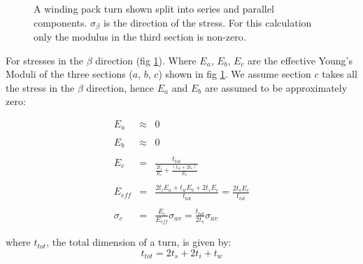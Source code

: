 \documentclass[hidelinks]{article}
\numberwithin{equation}{section}
\begin{document}
\begin{figure}[t!]
\begin{center}
      \end{center}
     \caption{A winding pack turn shown split into series and parallel components. 
     $\sigma_{\beta}$ is the direction of the stress. For this calculation only the 
     modulus in the third section is non-zero.} \label{fig: youngs-mod-diagram}
    \end{figure}

    \noi For stresses in the $\beta$ direction (fig \ref{fig: youngs-mod-diagram}). Where
    $E_a$, $E_b$, $E_c$ are the effective Young's Moduli of the three sections 
    ($a$, $b$, $c$) shown in fig \ref{fig: youngs-mod-diagram}. We assume section $c$ takes 
    all the stress in the $\beta$ direction, hence $E_a$ and $E_b$ are assumed to be 
    approximately zero:

    \begin{eqnarray}\label{eq: beta-direction-stresses}
        E_{a} &\approx& 0 \\
        \nonumber \\
        E_{b} &\approx& 0\\
        \nonumber \\
        E_{c} &=& \frac{t_{tot}}{\frac{2t_i}{E_i} + \frac{(t_w + 2t_s)}{E_s}} \\
        \nonumber \\
        E_{eff} &=& \frac{2t_iE_a + t_wE_b + 2t_sE_c}{t_{tot}} = \frac{2t_sE_c}{t_{tot}} \\
        \nonumber \\
        \sigma_c &=& \frac{E_c}{E_{eff}} \sigma_{av} = \frac{t_{tot}}{2t_s} \sigma_{av}
    \end{eqnarray}

    \noi where $t_{tot}$, the total dimension of a turn, is given by:
    \begin{equation}
        t_{tot} = 2t_s + 2t_i + t_w
    \end{equation}
        
\end{document}
